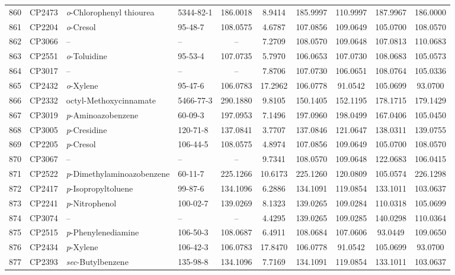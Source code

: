 \begin{longtable}{clllcccccc}
860 & CP2473 & \textit{o}-Chlorophenyl thiourea & 5344-82-1 & 186.0018 & 8.9414 & 185.9997 & 110.9997 & 187.9967 & 186.0000 \\ 
861 & CP2204 & \textit{o}-Cresol & 95-48-7 & 108.0575 & 4.6787 & 107.0856 & 109.0649 & 105.0700 & 108.0570 \\ 
862 & CP3066 & – & – & – & 7.2709 & 108.0570 & 109.0648 & 107.0813 & 110.0683 \\ 
863 & CP2551 & \textit{o}-Toluidine\smash{\textsuperscript{\textdaggerdbl}} & 95-53-4 & 107.0735 & 5.7970 & 106.0653 & 107.0730 & 108.0683 & 105.0573 \\ 
864 & CP3017 & – & – & – & 7.8706 & 107.0730 & 106.0651 & 108.0764 & 105.0336 \\ 
865 & CP2432 & \textit{o}-Xylene & 95-47-6 & 106.0783 & 17.2962 & 106.0778 & 91.0542 & 105.0699 & 93.0700 \\ 
866 & CP2332 & octyl-Methoxycinnamate & 5466-77-3 & 290.1880 & 9.8105 & 150.1405 & 152.1195 & 178.1715 & 179.1429 \\ 
867 & CP3019 & \textit{p}-Aminoazobenzene & 60-09-3 & 197.0953 & 7.1496 & 197.0960 & 198.0499 & 167.0406 & 105.0450 \\ 
868 & CP3005 & \textit{p}-Cresidine & 120-71-8 & 137.0841 & 3.7707 & 137.0846 & 121.0647 & 138.0311 & 139.0755 \\ 
869 & CP2205 & \textit{p}-Cresol & 106-44-5 & 108.0575 & 4.8974 & 107.0856 & 109.0649 & 105.0700 & 108.0570 \\ 
870 & CP3067 & – & – & – & 9.7341 & 108.0570 & 109.0648 & 122.0683 & 106.0415 \\ 
871 & CP2522 & \textit{p}-Dimethylaminoazobenzene & 60-11-7 & 225.1266 & 10.6173 & 225.1260 & 120.0809 & 105.0574 & 226.1298 \\ 
872 & CP2417 & \textit{p}-Isopropyltoluene & 99-87-6 & 134.1096 & 6.2886 & 134.1091 & 119.0854 & 133.1011 & 103.0637 \\ 
873 & CP2241 & \textit{p}-Nitrophenol & 100-02-7 & 139.0269 & 8.1323 & 139.0265 & 109.0284 & 110.0318 & 105.0699 \\ 
874 & CP3074 & – & – & – & 4.4295 & 139.0265 & 109.0285 & 140.0298 & 110.0364 \\ 
875 & CP2515 & \textit{p}-Phenylenediamine & 106-50-3 & 108.0687 & 6.4911 & 108.0684 & 107.0606 & 93.0449 & 109.0650 \\ 
876 & CP2434 & \textit{p}-Xylene & 106-42-3 & 106.0783 & 17.8470 & 106.0778 & 91.0542 & 105.0699 & 93.0700 \\ 
877 & CP2393 & \textit{sec}-Butylbenzene & 135-98-8 & 134.1096 & 7.7169 & 134.1091 & 119.0854 & 133.1011 & 103.0637 \\ 

\end{longtable}
